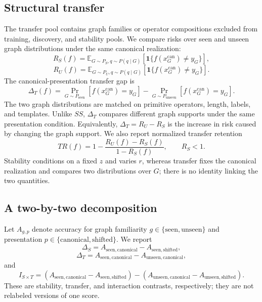 \documentclass[11pt,a4paper]{article}
\theoremstyle{plain}
\begin{document}
\subsection{Structural transfer}

The transfer pool contains graph families or operator compositions excluded
from training, discovery, and stability pools. We compare risks over seen and
unseen graph distributions under the same canonical realization:
\begin{equation}
R_S(f)=\mathbb E_{G\sim P_S,q\sim P(q\mid G)}
\left[\mathbf 1\{f(x_G^{\mathrm{can}})\neq y_G\}\right],
\end{equation}
\begin{equation}
R_U(f)=\mathbb E_{G\sim P_U,q\sim P(q\mid G)}
\left[\mathbf 1\{f(x_G^{\mathrm{can}})\neq y_G\}\right].
\end{equation}
The canonical-presentation transfer gap is
\begin{equation}
\Delta_T(f)=
\Pr_{G\sim P_{\mathrm{seen}}}[f(x_G^{\mathrm{can}})=y_G]
-\Pr_{G\sim P_{\mathrm{unseen}}}[f(x_G^{\mathrm{can}})=y_G].
\end{equation}
The two graph distributions are matched on primitive operators, length, labels,
and templates. Unlike $SS$, $\Delta_T$ compares different graph supports under
the same presentation condition.
Equivalently, $\Delta_T=R_U-R_S$ is the increase in risk caused by changing
the graph support. We also report normalized transfer retention
\begin{equation}
TR(f)=1-\frac{R_U(f)-R_S(f)}{1-R_S(f)},\qquad R_S<1.
\end{equation}
Stability conditions on a fixed $z$ and varies $r$, whereas transfer fixes the
canonical realization and compares two distributions over $G$; there is no
identity linking the two quantities.

\subsection{A two-by-two decomposition}

Let $A_{g,p}$ denote accuracy for graph familiarity
$g\in\{\mathrm{seen},\mathrm{unseen}\}$ and presentation
$p\in\{\mathrm{canonical},\mathrm{shifted}\}$. We report
\begin{equation}
\Delta_S=A_{\mathrm{seen,canonical}}-A_{\mathrm{seen,shifted}},
\end{equation}
\begin{equation}
\Delta_T=A_{\mathrm{seen,canonical}}-A_{\mathrm{unseen,canonical}},
\end{equation}
and
\begin{equation}
I_{S\times T}=
\left(A_{\mathrm{seen,canonical}}-A_{\mathrm{seen,shifted}}\right)
-\left(A_{\mathrm{unseen,canonical}}-A_{\mathrm{unseen,shifted}}\right).
\end{equation}
These are stability, transfer, and interaction contrasts, respectively; they
are not relabeled versions of one score.
\end{document}
